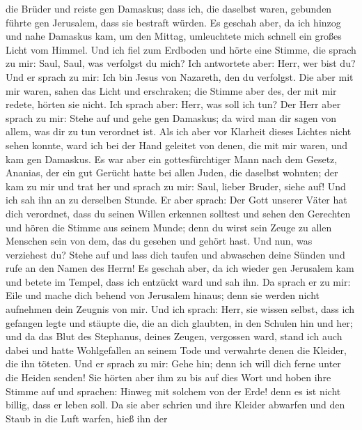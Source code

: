 die Brüder und reiste gen Damaskus; dass ich, die daselbst waren,
gebunden führte gen Jerusalem, dass sie bestraft würden.  Es
geschah aber, da ich hinzog und nahe Damaskus kam, um den Mittag,
umleuchtete mich schnell ein großes Licht vom Himmel.  Und
ich fiel zum Erdboden und hörte eine Stimme, die sprach zu mir: Saul,
Saul, was verfolgst du mich?  Ich antwortete aber: Herr, wer
bist du? Und er sprach zu mir: Ich bin Jesus von Nazareth, den du
verfolgst.  Die aber mit mir waren, sahen das Licht und
erschraken; die Stimme aber des, der mit mir redete, hörten sie nicht.
 Ich sprach aber: Herr, was soll ich tun? Der Herr aber
sprach zu mir: Stehe auf und gehe gen Damaskus; da wird man dir sagen
von allem, was dir zu tun verordnet ist.  Als ich aber vor
Klarheit dieses Lichtes nicht sehen konnte, ward ich bei der Hand
geleitet von denen, die mit mir waren, und kam gen Damaskus.
 Es war aber ein gottesfürchtiger Mann nach dem Gesetz,
Ananias, der ein gut Gerücht hatte bei allen Juden, die daselbst
wohnten;  der kam zu mir und trat her und sprach zu mir:
Saul, lieber Bruder, siehe auf! Und ich sah ihn an zu derselben Stunde.
 Er aber sprach: Der Gott unserer Väter hat dich verordnet,
dass du seinen Willen erkennen solltest und sehen den Gerechten und
hören die Stimme aus seinem Munde;  denn du wirst sein
Zeuge zu allen Menschen sein von dem, das du gesehen und gehört hast.
 Und nun, was verziehest du? Stehe auf und lass dich taufen
und abwaschen deine Sünden und rufe an den Namen des Herrn!
 Es geschah aber, da ich wieder gen Jerusalem kam und
betete im Tempel, dass ich entzückt ward und sah ihn.  Da
sprach er zu mir: Eile und mache dich behend von Jerusalem hinaus; denn
sie werden nicht aufnehmen dein Zeugnis von mir.  Und ich
sprach: Herr, sie wissen selbst, dass ich gefangen legte und stäupte
die, die an dich glaubten, in den Schulen hin und her;  und
da das Blut des Stephanus, deines Zeugen, vergossen ward, stand ich auch
dabei und hatte Wohlgefallen an seinem Tode und verwahrte denen die
Kleider, die ihn töteten.  Und er sprach zu mir: Gehe hin;
denn ich will dich ferne unter die Heiden senden!  Sie
hörten aber ihm zu bis auf dies Wort und hoben ihre Stimme auf und
sprachen: Hinweg mit solchem von der Erde! denn es ist nicht billig,
dass er leben soll.  Da sie aber schrien und ihre Kleider
abwarfen und den Staub in die Luft warfen,  hieß ihn der
